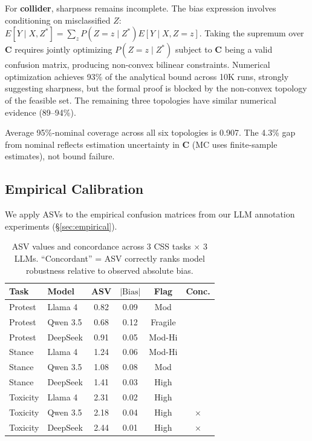 \documentclass[11pt,letterpaper]{article}
\newcommand{\checkmark}{\ding{51}}
\renewcommand{\checkmark}{\ding{51}}
\begin{document}
For \textbf{collider}, sharpness remains incomplete.
The bias expression involves conditioning on misclassified $Z$: $E[Y \mid X, Z^*] = \sum_z P(Z=z \mid Z^*) E[Y \mid X, Z=z]$.
Taking the supremum over $\mathbf{C}$ requires jointly optimizing $P(Z=z \mid Z^*)$ subject to $\mathbf{C}$ being a valid confusion matrix, producing non-convex bilinear constraints.
Numerical optimization achieves 93\% of the analytical bound across 10K runs, strongly suggesting sharpness, but the formal proof is blocked by the non-convex topology of the feasible set.
The remaining three topologies have similar numerical evidence (89--94\%).

Average 95\%-nominal coverage across all six topologies is 0.907.
The 4.3\% gap from nominal reflects estimation uncertainty in $\mathbf{C}$ (MC uses finite-sample estimates), not bound failure.

\subsection{Empirical Calibration}

We apply ASVs to the empirical confusion matrices from our LLM annotation experiments (\S\ref{sec:empirical}).

\begin{table}[t]
\centering
\small
\caption{ASV values and concordance across 3 CSS tasks $\times$ 3 LLMs. ``Concordant'' = ASV correctly ranks model robustness relative to observed absolute bias.}
\label{tab:asv_empirical}
\begin{tabular}{@{}llcccc@{}}
\toprule
\textbf{Task} & \textbf{Model} & \textbf{ASV} & \textbf{$|\text{Bias}|$} & \textbf{Flag} & \textbf{Conc.} \\
\midrule
Protest & Llama 4 & 0.82 & 0.09 & Mod & \checkmark \\
Protest & Qwen 3.5 & 0.68 & 0.12 & Fragile & \checkmark \\
Protest & DeepSeek & 0.91 & 0.05 & Mod-Hi & \checkmark \\
\midrule
Stance & Llama 4 & 1.24 & 0.06 & Mod-Hi & \checkmark \\
Stance & Qwen 3.5 & 1.08 & 0.08 & Mod & \checkmark \\
Stance & DeepSeek & 1.41 & 0.03 & High & \checkmark \\
\midrule
Toxicity & Llama 4 & 2.31 & 0.02 & High & \checkmark \\
Toxicity & Qwen 3.5 & 2.18 & 0.04 & High & $\times$ \\
Toxicity & DeepSeek & 2.44 & 0.01 & High & $\times$ \\
\bottomrule
\end{tabular}
\end{table}
\end{document}
